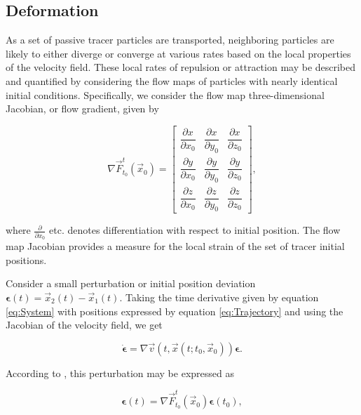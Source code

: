 \subsection{Deformation}\label{sec:Deformation}

As a set of passive tracer particles are transported, neighboring particles are likely to either diverge or converge at various rates based on the local properties of the velocity field. These local rates of repulsion or attraction may be described and quantified by considering the flow maps of particles with nearly identical initial conditions. Specifically, we consider the flow map three-dimensional Jacobian, or flow gradient, given by

\begin{equation}\label{eq:Jacobian}
	\nabla \vec{F}_{t_0}^t(\vec{x}_0) =
	\begin{bmatrix}
		\dfrac{\partial x}{\partial x_0} & \dfrac{\partial x}{\partial y_0} & \dfrac{\partial x}{\partial z_0} \\[2ex]
		\dfrac{\partial y}{\partial x_0} & \dfrac{\partial y}{\partial y_0} & \dfrac{\partial y}{\partial z_0} \\[2ex]
		\dfrac{\partial z}{\partial x_0} & \dfrac{\partial z}{\partial y_0} & \dfrac{\partial z}{\partial z_0}
	\end{bmatrix},
\end{equation}

\noindent where $\frac{\partial}{\partial x_0}$ etc. denotes differentiation with respect to initial position. The flow map Jacobian provides a measure for the local strain of the set of tracer initial positions.

Consider a small perturbation or initial position deviation $\bm{\epsilon}(t) = \vec{x}_2(t)-\vec{x}_1(t)$. Taking the time derivative given by equation \eqref{eq:System} with positions expressed by equation \eqref{eq:Trajectory} and using the Jacobian of the velocity field, we get

\begin{equation}\label{eq:EpsilonDot}
	\dot{\bm{\epsilon}} = \nabla \vec{v}(t,\vec{x}(t;t_0,\vec{x}_0)) \bm{\epsilon}.
\end{equation}

\noindent According to \cite{LCSreview}, this perturbation may be expressed as

\begin{equation}\label{eq:epsilon_of_t}
	\bm{\epsilon}(t) = \nabla \vec{F}_{t_0}^t(\vec{x}_0) \bm{\epsilon}(t_0),
\end{equation}

